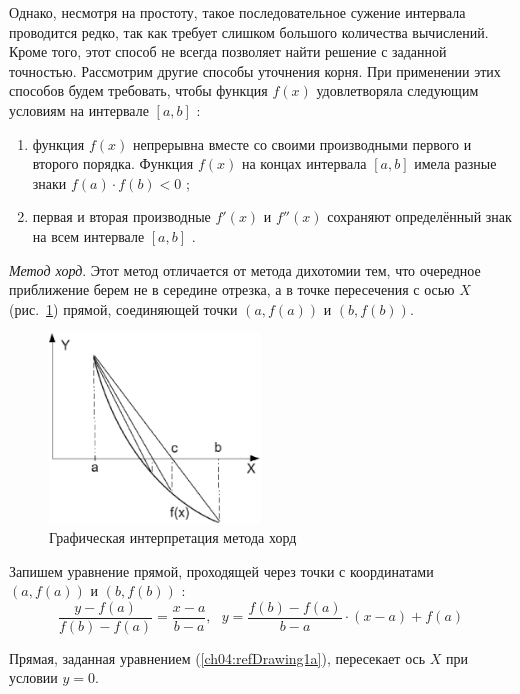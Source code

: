 Однако, несмотря на простоту, такое последовательное сужение интервала проводится редко, так как требует слишком
большого количества вычислений. Кроме того, этот способ не всегда позволяет найти решение с заданной точностью.
Рассмотрим другие способы уточнения корня. При применении этих способов будем требовать, чтобы функция  $f(x)$ 
удовлетворяла следующим условиям на интервале  $[a,b]$ :
\begin{enumerate}
\item функция  $f(x)$  непрерывна вместе со своими производными первого и второго порядка. Функция  $f(x)$  на концах
интервала  $[a,b]$  имела разные знаки  $f(a)\cdot f(b)<0$ ;
\item первая и вторая производные  $f'(x)$  и  $f''(x)$ сохраняют определённый
знак на всем интервале  $[a,b]$ .
\end{enumerate}

\emph{Метод хорд}. Этот метод отличается от метода дихотомии тем, что очередное приближение берем не в
середине отрезка, а в точке пересечения с осью $X$ (рис.~\ref{ch04:refDrawing4}) прямой, соединяющей точки 
$(a,f(a))$ и  $(b,f(b))$.

\begin{figure}[htb]
\begin{center}
\includegraphics[width=0.5\textwidth]{img/ris_4_5}
\caption{Графическая интерпретация метода хорд}
\label{ch04:refDrawing4}
\end{center}
\end{figure}

Запишем уравнение прямой, проходящей через точки с координатами   $(a,f(a))$  и  $(b,f(b))$ :
\begin{equation}\label{ch04:refDrawing1a}
\frac{y-f(a)}{f(b)-f(a)}=\frac{x-a}{b-a},\ \ \  y=\frac{f(b)-f(a)}{b-a}\cdot (x-a)+f(a)
\end{equation}

Прямая, заданная уравнением (\ref{ch04:refDrawing1a}), пересекает ось $X$ при условии $y=0$.

